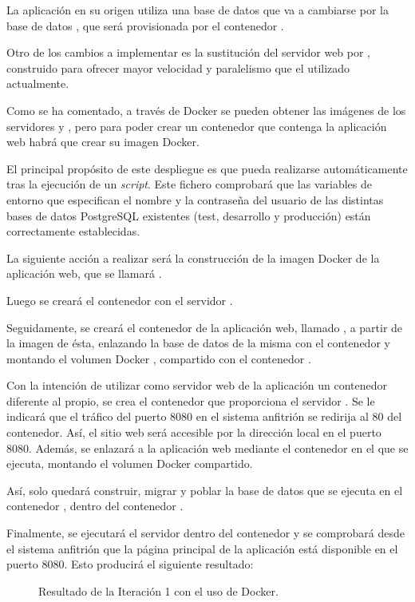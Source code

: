 La aplicación en su origen utiliza una base de datos  que va a cambiarse por la base de datos , que será provisionada por el contenedor . 

Otro de los cambios a implementar es la sustitución del servidor web  por , construido para ofrecer mayor velocidad y paralelismo que el utilizado actualmente.

Como se ha comentado, a través de Docker se pueden obtener las imágenes de los servidores  y , pero para poder crear un contenedor que contenga la aplicación web habrá que crear su imagen Docker. 

El principal propósito de este despliegue es que pueda realizarse automáticamente tras la ejecución de un \textit{script}. Este fichero comprobará que las variables de entorno que especifican el nombre y la contraseña del usuario de las distintas bases de datos PostgreSQL existentes (test, desarrollo y producción) están correctamente establecidas.

La siguiente acción a realizar será la construcción de la imagen Docker de la aplicación web, que se llamará . 

Luego se creará el contenedor  con el servidor .

Seguidamente, se creará el contenedor de la aplicación web, llamado , a partir de la imagen de ésta, enlazando la base de datos de la misma con el contenedor  y montando el volumen Docker , compartido con el contenedor .

Con la intención de utilizar como servidor web de la aplicación un contenedor diferente al propio, se crea el contenedor  que proporciona el servidor . Se le indicará que el tráfico del puerto 8080 en el sistema anfitrión se redirija al 80 del contenedor. Así, el sitio web será accesible por la dirección local en el puerto 8080. Además, se enlazará a la aplicación web mediante el contenedor en el que se ejecuta, montando el volumen Docker compartido.

Así, solo quedará construir, migrar y poblar la base de datos que se ejecuta en el contenedor , dentro del contenedor .

Finalmente, se ejecutará el servidor  dentro del contenedor  y se comprobará desde el sistema anfitrión que la página principal de la aplicación  está disponible en el puerto 8080. Esto producirá el siguiente resultado:
\begin{figure}[H]
\caption{Resultado de la Iteración 1 con el uso de Docker.\label{fig:figure_placement_example}}
\end{figure}

